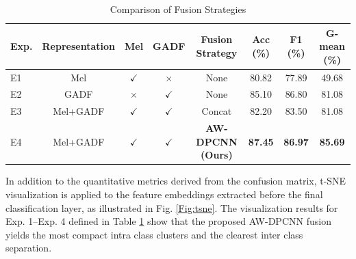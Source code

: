 \documentclass[anonymous]{iopjournal}
\begin{document}
\begin{table}
	\centering
	\caption{Comparison of Fusion Strategies}
	\begin{tabular}{lccccccc}
		\toprule
		\textbf{Exp.} & \textbf{Representation} & \textbf{Mel} & \textbf{GADF} & \textbf{Fusion Strategy} 
		& \textbf{Acc (\%)} & \textbf{F1 (\%)} & \textbf{G-mean (\%)} \\
		\midrule
		E1 & Mel      & $\checkmark$ & $\times$ & None  
		& 80.82 & 77.89 & 49.68 \\
		E2 & GADF     & $\times$ & $\checkmark$ & None 
		& 85.10 & 86.80 & 81.08 \\
		E3 & Mel+GADF & $\checkmark$ & $\checkmark$ & Concat 
		& 82.20 & 83.50 & 81.08 \\
		E4 & Mel+GADF & $\checkmark$ & $\checkmark$ & \textbf{AW-DPCNN (Ours)} 
		& \textbf{87.45} & \textbf{86.97} & \textbf{85.69} \\
		\bottomrule
	\end{tabular}
	\label{tab:fusion_exp_simple}
\end{table}



In addition to the quantitative metrics derived from the confusion matrix, t-SNE visualization is applied to the feature embeddings extracted before the final classification layer, as illustrated in Fig. \ref{Fig:tsne}. The visualization results for Exp. 1–Exp. 4 defined in Table \ref{tab:fusion_exp_simple} show that the proposed AW-DPCNN fusion yields the most compact intra class clusters and the clearest inter class separation.
\end{document}
